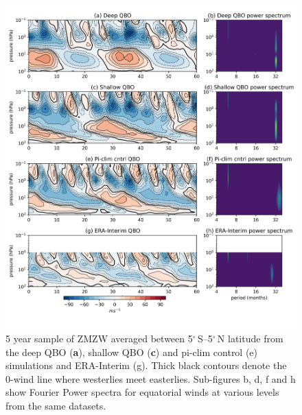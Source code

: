 \begin{figure}[h!]
\begin{center}
\noindent\includegraphics[width = \linewidth]{Figures/Figures-deepQBO/experiment_QBOs.png}
\caption[Equatorial ZMZW time-height profiles from QBO experiments]{5 year sample of ZMZW averaged between 5$^{\circ}$\,S--5$^{\circ}$\,N latitude from the deep QBO (\textbf{a}), shallow QBO (\textbf{c}) and pi-clim control (e) simulations and ERA-Interim (g). Thick black contours denote the 0-wind line where westerlies meet easterlies. Sub-figures b, d, f and h show Fourier Power spectra for equatorial winds at various levels from the same datasets.}
\label{fig:experiment_QBOs}
\end{center}
\end{figure}

